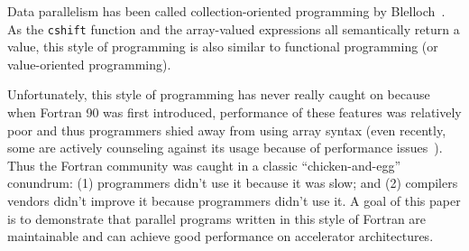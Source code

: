 Data parallelism has been called collection-oriented programming by
Blelloch~\cite{blelloch90}.  As the {\tt cshift}
function and the array-valued expressions all semantically return a
value, this style of programming is also similar to functional
programming (or value-oriented programming). 





Unfortunately, this style of programming has never really caught on
because when Fortran 90 was first introduced, performance of these
features was relatively poor and thus programmers shied away from
using array syntax (even recently, some are actively counseling against its
usage because of performance issues~\cite{Levesque:SC08}).  Thus the
Fortran community was caught in a classic ``chicken-and-egg''
conundrum: (1) programmers didn't use it because it was slow; and (2)
compilers vendors didn't improve it because programmers didn't use it.
A goal of this paper is to demonstrate that parallel programs written
in this style of Fortran are maintainable and can achieve good
performance on accelerator architectures.


